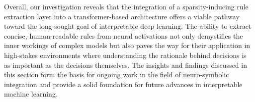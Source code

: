 \documentclass{article}
\begin{document}
Overall, our investigation reveals that the integration of a sparsity-inducing rule extraction layer into a transformer-based architecture offers a viable pathway toward the long-sought goal of interpretable deep learning. The ability to extract concise, human-readable rules from neural activations not only demystifies the inner workings of complex models but also paves the way for their application in high-stakes environments where understanding the rationale behind decisions is as important as the decisions themselves. The insights and findings discussed in this section form the basis for ongoing work in the field of neuro-symbolic integration and provide a solid foundation for future advances in interpretable machine learning.
\end{document}
